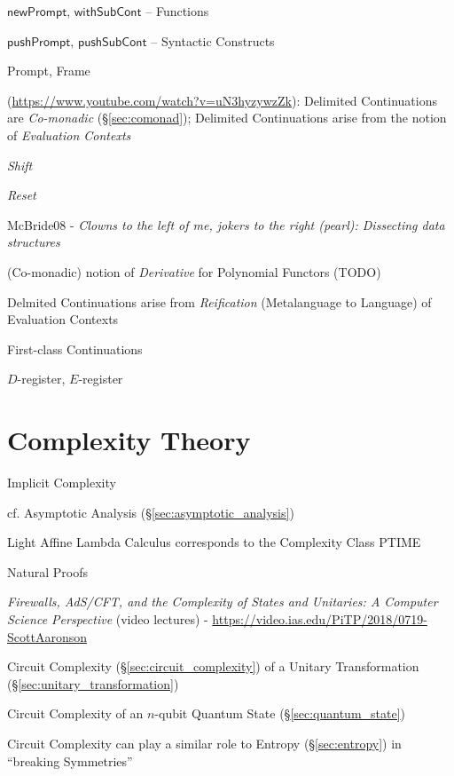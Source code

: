 $\mathsf{newPrompt}$,
$\mathsf{withSubCont}$ -- Functions

$\mathsf{pushPrompt}$,
$\mathsf{pushSubCont}$ -- Syntactic Constructs

Prompt, Frame

\asterism

(\url{https://www.youtube.com/watch?v=uN3hyzywzZk}): Delimited Continuations are
\emph{Co-monadic} (\S\ref{sec:comonad}); Delimited Continuations arise from the
notion of \emph{Evaluation Contexts}

\emph{Shift}

\emph{Reset}

McBride08 - \emph{Clowns to the left of me, jokers to the right (pearl):
  Dissecting data structures}

(Co-monadic) notion of \emph{Derivative} for Polynomial
Functors (TODO)

Delmited Continuations arise from \emph{Reification} (Metalanguage to Language)
of Evaluation Contexts

First-class Continuations

$D$-register, $E$-register



\section{Complexity Theory}\label{sec:complexity_theory}

Implicit Complexity

cf. Asymptotic Analysis (\S\ref{sec:asymptotic_analysis}) %

Light Affine Lambda Calculus corresponds to the Complexity Class PTIME

Natural Proofs %

\asterism

\emph{Firewalls, AdS/CFT, and the Complexity of States and Unitaries: A Computer
  Science Perspective}
(video lectures)
-
\url{https://video.ias.edu/PiTP/2018/0719-ScottAaronson}

Circuit Complexity (\S\ref{sec:circuit_complexity}) of a
Unitary Transformation (\S\ref{sec:unitary_transformation})

Circuit Complexity of an $n$-qubit Quantum State (\S\ref{sec:quantum_state})

Circuit Complexity can play a similar role to Entropy (\S\ref{sec:entropy}) in
``breaking Symmetries''

